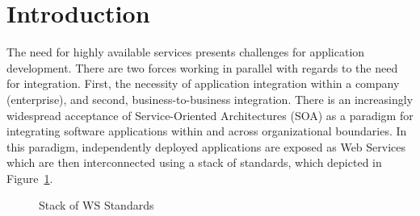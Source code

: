 \documentclass{llncs}
\begin{document}

%
%



\section{Introduction}
\label{sect:introduction}

The need for highly available services presents challenges for application development.
There are two forces working in parallel with regards to the need for integration.
First, the necessity of application integration within a company (enterprise), and second, business-to-business integration.
There is an increasingly widespread acceptance of Service-Oriented Architectures (SOA) as a paradigm for integrating software applications within and across organizational boundaries.
In this paradigm, independently deployed applications are exposed as Web Services which are then 
interconnected using a stack of standards, which depicted in Figure~\ref{fig:soa-stack}. 
		
		\begin{figure}[ht]
		\begin{centering}
		\caption{Stack of WS Standards}
		\label{fig:soa-stack}
		\end{centering}
		\end{figure}
		
\end{document}

